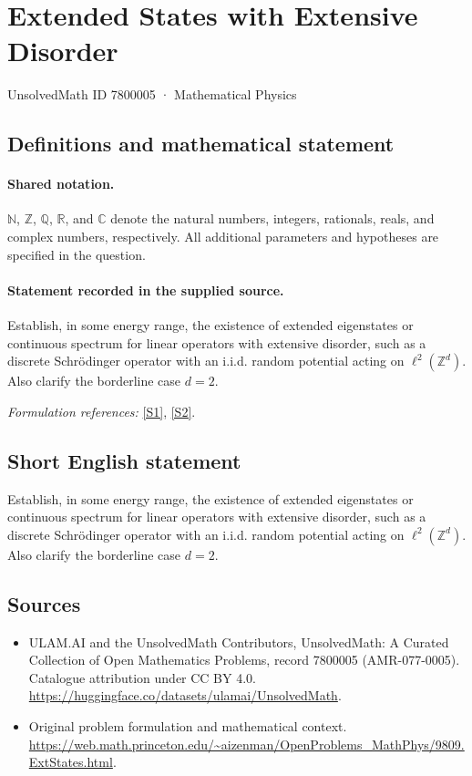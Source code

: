 \documentclass[11pt]{article}
\newcommand{\sref}[2]{\hyperlink{source:#1:#2}{[S#2]}}
\begin{document}
\setcounter{section}{7800004}
\section{Extended States with Extensive Disorder}\label{7800005}
{\small UnsolvedMath ID 7800005 · Mathematical Physics}
\subsection{Definitions and mathematical statement}

\paragraph{Shared notation.}$\mathbb N$, $\mathbb Z$, $\mathbb Q$, $\mathbb R$, and $\mathbb C$ denote the natural numbers, integers, rationals, reals, and complex numbers, respectively. All additional parameters and hypotheses are specified in the question.


\paragraph{Statement recorded in the supplied source.}
Establish, in some energy range, the existence of extended eigenstates or continuous spectrum for linear operators with extensive disorder, such as a discrete Schrödinger operator with an i.i.d. random potential acting on $\ell^2(\mathbb{Z}^d)$. Also clarify the borderline case $d=2$.
\par\smallskip\textit{Formulation references:} \sref{7800005}{1}, \sref{7800005}{2}.
\subsection{Short English statement}
Establish, in some energy range, the existence of extended eigenstates or continuous spectrum for linear operators with extensive disorder, such as a discrete Schrödinger operator with an i.i.d. random potential acting on $\ell^2(\mathbb{Z}^d)$. Also clarify the borderline case $d=2$.
\subsection{Sources}
\begin{itemize}
\item[\hypertarget{source:7800005:1}{S1}] ULAM.AI and the UnsolvedMath Contributors, UnsolvedMath: A Curated Collection of Open Mathematics Problems, record 7800005 (AMR-077-0005). Catalogue attribution under CC BY 4.0.
\url{https://huggingface.co/datasets/ulamai/UnsolvedMath}.
\item[\hypertarget{source:7800005:2}{S2}] Original problem formulation and mathematical context.
\url{https://web.math.princeton.edu/~aizenman/OpenProblems_MathPhys/9809.ExtStates.html}.
\end{itemize}
\label{end:7800005}
\end{document}

